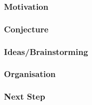 \subsubsection{Motivation}
\subsubsection{Conjecture}
\subsubsection{Ideas/Brainstorming}
\subsubsection{Organisation}
\subsubsection{Next Step}
